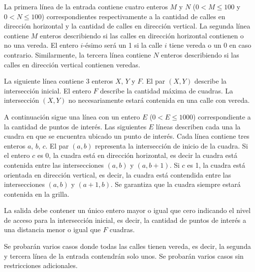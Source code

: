 \documentclass{oci}
\begin{document}
\begin{inputDescription}
  La primera línea de la entrada contiene cuatro enteros $M$ y $N$ ($0 < M \leq 100$ y $0 < N\leq 100$)
  correspondientes respectivamente a la cantidad de calles en dirección horizontal y la cantidad de
  calles en dirección vertical.
  La segunda línea contiene $M$ enteros describiendo si las calles en dirección horizontal
  contienen o no una vereda.
  El entero $i$-ésimo será un 1 si la calle $i$ tiene vereda o un 0 en caso contrario.
  Similarmente, la tercera línea contiene $N$ enteros describiendo si las calles en dirección
  vertical contienen veredas.

  La siguiente línea contiene 3 enteros $X$, $Y$ y $F$.
  El par $(X, Y)$ describe la intersección inicial.
  El entero $F$ describe la cantidad máxima de cuadras.
  La intersección $(X, Y)$ no necesariamente estará contenida en una calle con vereda.

  A continuación sigue una línea con un entero $E$ ($0 < E \leq 1000$) correspondiente a la cantidad
  de puntos de interés.
  Las siguientes $E$ líneas describen cada una la cuadra en que se encuentra ubicado un punto de interés.
  Cada línea contiene tres enteros $a$, $b$, $c$.
  El par $(a, b)$ representa la intersección de inicio de la cuadra.
  Si el entero $c$ es 0, la cuadra está en dirección horizontal, es decir la cuadra está contenida entre las
  intersecciones $(a, b)$ y $(a, b + 1)$.
  Si $c$ es 1, la cuadra está orientada en dirección vertical, es decir, la cuadra está contendida entre
  las intersecciones $(a, b)$ y $(a + 1, b)$.
  Se garantiza que la cuadra siempre estará contenida en la grilla.
\end{inputDescription}

\begin{outputDescription}
  La salida debe contener un único entero mayor o igual que cero indicando el nivel de acceso para
  la intersección inicial, es decir, la cantidad de puntos de interés a una distancia menor o igual
  que $F$ cuadras.
\end{outputDescription}

\begin{scoreDescription}
  Se probarán varios casos donde todas las calles tienen vereda, es decir, la segunda y tercera
  línea de la entrada contendrán solo unos.
  Se probarán varios casos sin restricciones adicionales.
\end{scoreDescription}

\begin{sampleDescription}
\end{sampleDescription}
\end{document}
